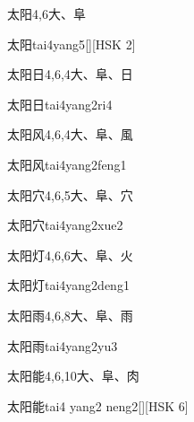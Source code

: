 \begin{Entry}{太阳}{4,6}{⼤、⾩}
  \begin{Phonetics}{太阳}{tai4yang5}[][HSK 2]
  \end{Phonetics}
\end{Entry}

\begin{Entry}{太阳日}{4,6,4}{⼤、⾩、⽇}
  \begin{Phonetics}{太阳日}{tai4yang2ri4}
  \end{Phonetics}
\end{Entry}

\begin{Entry}{太阳风}{4,6,4}{⼤、⾩、⾵}
  \begin{Phonetics}{太阳风}{tai4yang2feng1}
  \end{Phonetics}
\end{Entry}

\begin{Entry}{太阳穴}{4,6,5}{⼤、⾩、⽳}
  \begin{Phonetics}{太阳穴}{tai4yang2xue2}
  \end{Phonetics}
\end{Entry}

\begin{Entry}{太阳灯}{4,6,6}{⼤、⾩、⽕}
  \begin{Phonetics}{太阳灯}{tai4yang2deng1}
  \end{Phonetics}
\end{Entry}

\begin{Entry}{太阳雨}{4,6,8}{⼤、⾩、⾬}
  \begin{Phonetics}{太阳雨}{tai4yang2yu3}
  \end{Phonetics}
\end{Entry}

\begin{Entry}{太阳能}{4,6,10}{⼤、⾩、⾁}
  \begin{Phonetics}{太阳能}{tai4 yang2 neng2}[][HSK 6]
  \end{Phonetics}
\end{Entry}

